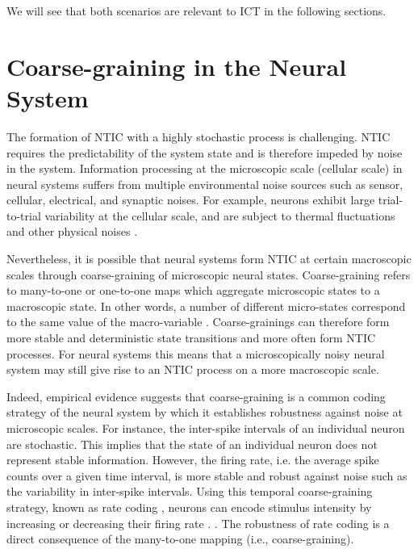 \documentclass[utf8]{article}
\begin{document}
                We will see that both scenarios are relevant to ICT in the following sections.
			

	\section{Coarse-graining in the Neural System} \label{sec:Neural coarse-graining}

		The formation of NTIC with a highly stochastic process is challenging. NTIC requires the predictability of the system state and is therefore impeded by noise in the system. Information processing at the microscopic scale (cellular scale) in neural systems suffers from multiple environmental noise sources such as sensor, cellular, electrical, and synaptic noises. For example, neurons exhibit large trial-to-trial variability at the cellular scale, and are subject to thermal fluctuations and other physical noises \citep{faisal2008noise}. 
		
  
		Nevertheless, it is possible that neural systems form NTIC at certain macroscopic scales through coarse-graining of microscopic neural states. Coarse-graining refers to many-to-one or one-to-one maps which aggregate microscopic states to a macroscopic state. In other words, a number of different micro-states correspond to the same value of the macro-variable \citep{price2007causation}. Coarse-grainings can therefore form more stable and deterministic state transitions and more often form NTIC processes. For neural systems this means that a microscopically noisy neural system may still give rise to an NTIC process on a more macroscopic scale.
		
		Indeed, empirical evidence suggests that coarse-graining is a common coding strategy of the neural system by which it establishes robustness against noise at microscopic scales. For instance, the inter-spike intervals of an individual neuron are stochastic. This implies that the state of an individual neuron does not represent stable information. However, the firing rate, i.e. the average spike counts over a given time interval, is more stable and robust against noise such as the variability in inter-spike intervals. Using this temporal coarse-graining strategy, known as rate coding \citep{adrian1926impulses, gerstner2002spiking, maass2001pulsed, panzeri2015neural, stein2005neuronal}, neurons can encode stimulus intensity by increasing or decreasing their firing rate \citep{kandel2000principles}. \citep{stein2005neuronal}. The robustness of rate coding is a direct consequence of the many-to-one mapping (i.e., coarse-graining).
		
\end{document}
